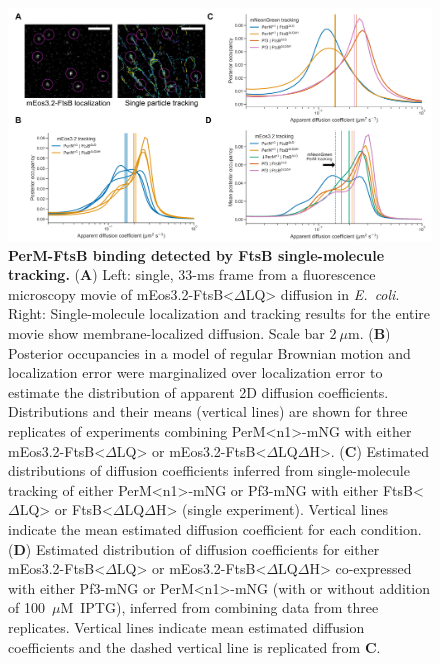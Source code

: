 \documentclass[twocolumn,pdflatex,sn-nature]{sn-jnl}%
\def\textsuperscript#1{<#1>}%
\newcommand\ec{\textit{E.~coli}}
\newcommand\ftsbdLQ{FtsB\textsuperscript{$\Delta{}$LQ}}
\newcommand\ftsbdLQdH{FtsB\textsuperscript{$\Delta{}$LQ$\Delta{}$H}}
\newcommand\permN{PerM\textsuperscript{n1}}
\begin{document}
\begin{figure}[htb]
    \centering
    \includegraphics[width=1.0\textwidth]{../figures/fig4.png}
    \caption{
        \textbf{PerM-FtsB binding detected by FtsB single-molecule tracking.}
        (\textbf{A}) Left: single, 33-ms frame from a fluorescence microscopy movie of mEos3.2-\ftsbdLQ{} diffusion in \ec{}. Right: Single-molecule localization and tracking results for the entire movie show membrane-localized diffusion. Scale bar $2~\mu$m.
        (\textbf{B}) Posterior occupancies in a model of regular Brownian motion and localization error were marginalized over localization error to estimate the distribution of apparent 2D diffusion coefficients. Distributions and their means (vertical lines) are shown for three replicates of experiments combining \permN{}-mNG with either mEos3.2-\ftsbdLQ{} or mEos3.2-\ftsbdLQdH{}.
        (\textbf{C}) Estimated distributions of diffusion coefficients inferred from single-molecule tracking of either \permN{}-mNG or Pf3-mNG with either \ftsbdLQ{} or \ftsbdLQdH{} (single experiment). Vertical lines indicate the mean estimated diffusion coefficient for each condition.
        (\textbf{D}) Estimated distribution of diffusion coefficients for either mEos3.2-\ftsbdLQ{} or mEos3.2-\ftsbdLQdH{} co-expressed with either Pf3-mNG or \permN{}-mNG (with or without addition of 100~$\mu$M~IPTG), inferred from combining data from three replicates. Vertical lines indicate mean estimated diffusion coefficients and the dashed vertical line is replicated from \textbf{C}.
    }\label{fig4}
\end{figure}
\end{document}
